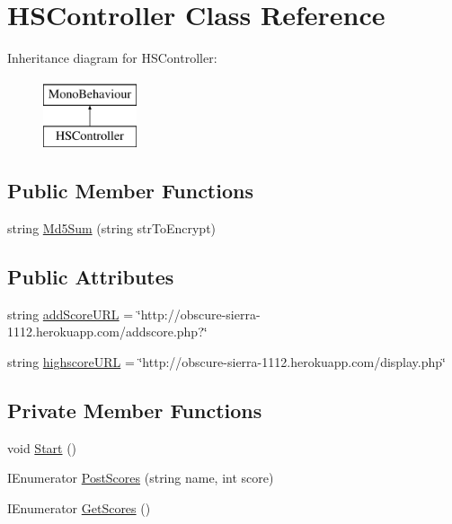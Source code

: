 \hypertarget{class_h_s_controller}{}\section{H\+S\+Controller Class Reference}
\label{class_h_s_controller}
Inheritance diagram for H\+S\+Controller\+:\begin{figure}[H]
\begin{center}
\leavevmode
\includegraphics[height=2.000000cm]{class_h_s_controller}
\end{center}
\end{figure}
\subsection*{Public Member Functions}
\begin{DoxyCompactItemize}
\item 
string \hyperlink{class_h_s_controller_a600035d811db21a2a3380c292b3c4e9f}{Md5\+Sum} (string str\+To\+Encrypt)
\end{DoxyCompactItemize}
\subsection*{Public Attributes}
\begin{DoxyCompactItemize}
\item 
string \hyperlink{class_h_s_controller_a0085dc21a81423ef8320f567f77cc8a5}{add\+Score\+U\+R\+L} = \char`\"{}http\+://obscure-\/sierra-\/1112.herokuapp.\+com/addscore.\+php?\char`\"{}
\item 
string \hyperlink{class_h_s_controller_a93e0dc2ed28bdd7d165934abc0a04545}{highscore\+U\+R\+L} = \char`\"{}http\+://obscure-\/sierra-\/1112.herokuapp.\+com/display.\+php\char`\"{}
\end{DoxyCompactItemize}
\subsection*{Private Member Functions}
\begin{DoxyCompactItemize}
\item 
void \hyperlink{class_h_s_controller_ad9bf5c196ec145b5475cd4b6a6c8909a}{Start} ()
\item 
I\+Enumerator \hyperlink{class_h_s_controller_a70db2c7b40c2f57db06c2e284bbd557b}{Post\+Scores} (string name, int score)
\item 
I\+Enumerator \hyperlink{class_h_s_controller_a91ca22b500452be2f96da94cb549dbc9}{Get\+Scores} ()
\end{DoxyCompactItemize}
